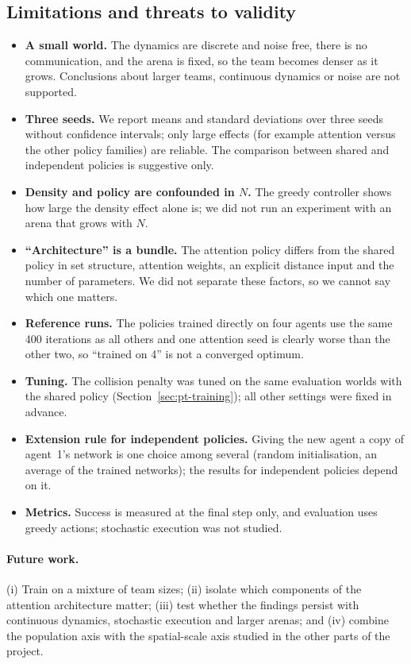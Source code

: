 \subsection{Limitations and threats to validity}
\label{sec:pt-limits}
\begin{itemize}
  \item \textbf{A small world.} The dynamics are discrete and noise free, there is no communication, and the arena is
        fixed, so the team becomes denser as it grows. Conclusions about larger teams, continuous dynamics or noise are
        not supported.
  \item \textbf{Three seeds.} We report means and standard deviations over three seeds without confidence intervals;
        only large effects (for example attention versus the other policy families) are reliable. The comparison between
        shared and independent policies is suggestive only.
  \item \textbf{Density and policy are confounded in $N$.} The greedy controller shows how large the density effect
        alone is; we did not run an experiment with an arena that grows with $N$.
  \item \textbf{``Architecture'' is a bundle.} The attention policy differs from the shared policy in set structure,
        attention weights, an explicit distance input and the number of parameters. We did not separate these factors,
        so we cannot say which one matters.
  \item \textbf{Reference runs.} The policies trained directly on four agents use the same 400 iterations as all others and
        one attention seed is clearly worse than the other two, so ``trained on 4'' is not a converged optimum.
  \item \textbf{Tuning.} The collision penalty was tuned on the same evaluation worlds with the shared policy
        (Section~\ref{sec:pt-training}); all other settings were fixed in advance.
  \item \textbf{Extension rule for independent policies.} Giving the new agent a copy of agent~1's network is one choice
        among several (random initialisation, an average of the trained networks); the results for independent
        policies depend on it.
  \item \textbf{Metrics.} Success is measured at the final step only, and evaluation uses greedy actions; stochastic
        execution was not studied.
\end{itemize}

\paragraph{Future work.}
(i) Train on a mixture of team sizes; (ii) isolate which components of the attention architecture matter;
(iii) test whether the findings persist with continuous dynamics, stochastic execution and larger arenas; and
(iv) combine the population axis with the spatial-scale axis studied in the other parts of the project.

